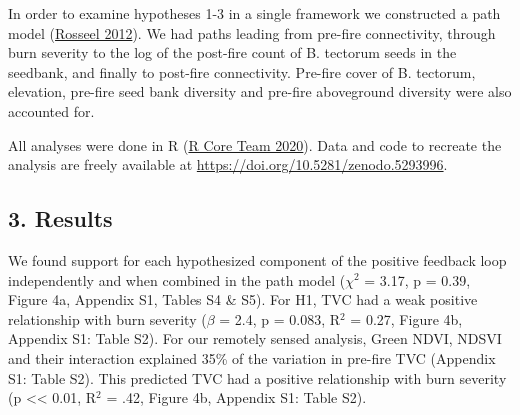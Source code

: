 \documentclass[
  12pt,
]{article}
\begin{document}
In order to examine hypotheses 1-3 in a single framework we constructed
a path model (\protect\hyperlink{ref-Rosseel2012}{Rosseel 2012}). We had
paths leading from pre-fire connectivity, through burn severity to the
log of the post-fire count of B. tectorum seeds in the seedbank, and
finally to post-fire connectivity. Pre-fire cover of B. tectorum,
elevation, pre-fire seed bank diversity and pre-fire aboveground
diversity were also accounted for.

All analyses were done in R (\protect\hyperlink{ref-R}{R Core Team
2020}). Data and code to recreate the analysis are freely available at
\url{https://doi.org/10.5281/zenodo.5293996}.

\hypertarget{results}{%
\subsection{3. Results}\label{results}}

We found support for each hypothesized component of the positive
feedback loop independently and when combined in the path model
(\(\chi^2\) = 3.17, p = 0.39, Figure 4a, Appendix S1, Tables S4 \& S5).
For H1, TVC had a weak positive relationship with burn severity
(\(\beta\) = 2.4, p = 0.083, R\(^2\) = 0.27, Figure 4b, Appendix S1:
Table S2). For our remotely sensed analysis, Green NDVI, NDSVI and their
interaction explained 35\% of the variation in pre-fire TVC (Appendix
S1: Table S2). This predicted TVC had a positive relationship with burn
severity (p \textless\textless{} 0.01, R\(^2\) = .42, Figure 4b,
Appendix S1: Table S2).
\end{document}
